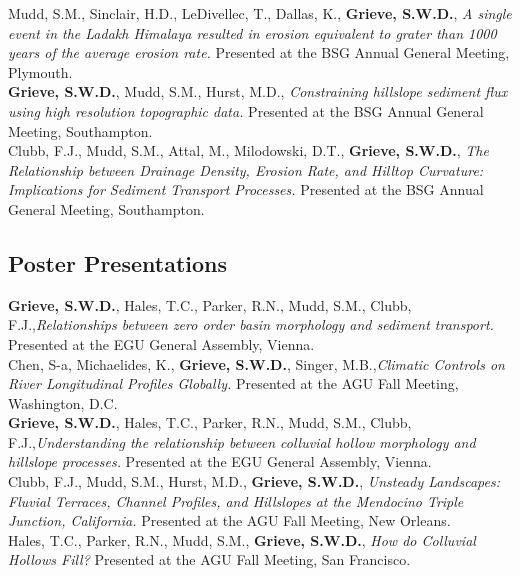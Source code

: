 \documentclass[10pt, a4paper]{article}
\newcommand{\years}[1]{\marginnote{\scriptsize #1}}
\begin{document}
\years{2016}Mudd, S.M., Sinclair, H.D., LeDivellec, T., Dallas, K., \textbf{Grieve, S.W.D.}, \textit{A single event in the Ladakh Himalaya resulted in erosion equivalent to grater than 1000 years of the average erosion rate.} Presented at the BSG Annual General Meeting, Plymouth.\\[0.05cm]

\years{2015}\textbf{Grieve, S.W.D.}, Mudd, S.M., Hurst, M.D., \textit{Constraining hillslope sediment flux using high resolution topographic data.} Presented at the BSG Annual General Meeting, Southampton.\\[0.05cm]

\years{2015}Clubb, F.J., Mudd, S.M., Attal, M., Milodowski, D.T., \textbf{Grieve, S.W.D.}, \textit{The Relationship between Drainage Density, Erosion Rate, and Hilltop Curvature: Implications for Sediment Transport Processes.} Presented at the BSG Annual General Meeting, Southampton.

\subsection*{Poster Presentations}

\years{2019}\textbf{Grieve, S.W.D.}, Hales, T.C., Parker, R.N., Mudd, S.M., Clubb, F.J.,\textit{Relationships between zero order basin morphology and sediment transport.} Presented at the EGU General Assembly, Vienna.\\[0.05cm]

\years{2018}Chen, S-a, Michaelides, K., \textbf{Grieve, S.W.D.}, Singer, M.B.,\textit{Climatic Controls on River Longitudinal Profiles Globally.} Presented at the AGU Fall Meeting, Washington, D.C.\\[0.05cm]

\years{2018}\textbf{Grieve, S.W.D.}, Hales, T.C., Parker, R.N., Mudd, S.M., Clubb, F.J.,\textit{Understanding the relationship between colluvial hollow morphology and hillslope processes.} Presented at the EGU General Assembly, Vienna.\\[0.05cm]

\years{2017}Clubb, F.J., Mudd, S.M., Hurst, M.D., \textbf{Grieve, S.W.D.}, \textit{Unsteady Landscapes: Fluvial Terraces, Channel Profiles, and Hillslopes at the Mendocino Triple Junction, California.} Presented at the AGU Fall Meeting, New Orleans.\\[0.05cm]

\years{2016}Hales, T.C., Parker, R.N., Mudd, S.M., \textbf{Grieve, S.W.D.}, \textit{How do Colluvial Hollows Fill?} Presented at the AGU Fall Meeting, San Francisco.\\[0.05cm]
\end{document}
